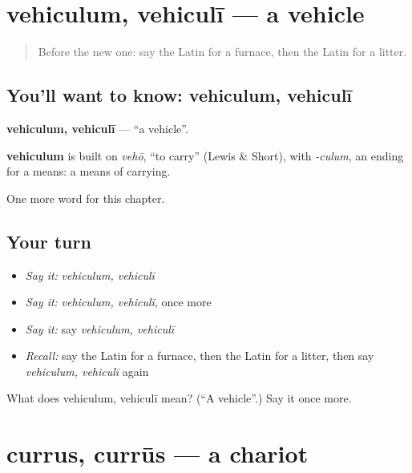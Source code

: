 \section[vehiculum, vehiculī]{vehiculum, vehiculī — a vehicle}

\label{lesson:LA-C217-vehiculum}



\begin{quote}
Before the new one: say the Latin for a furnace, then the Latin for a litter.
\end{quote}

\subsection*{You'll want to know: vehiculum, vehiculī}
\textbf{vehiculum, vehiculī} — \textquotedblleft{}a vehicle\textquotedblright{}.

\begin{cousinweb}
\textbf{vehiculum} is built on \emph{vehō}, \textquotedblleft{}to carry\textquotedblright{} (Lewis \& Short), with \emph{-culum}, an ending for a means: a means of carrying.
\end{cousinweb}

\begin{grammarlens}[title={What you've built}]
One more word for this chapter.
\end{grammarlens}

\subsection*{Your turn}
\begin{itemize}
\raggedright
  \item \emph{Say it:} \emph{vehiculum, vehiculī}
  \item \emph{Say it:} \emph{vehiculum, vehiculī}, once more
  \item \emph{Say it:} say \emph{vehiculum, vehiculī}
  \item \emph{Recall:} say the Latin for a furnace, then the Latin for a litter, then say \emph{vehiculum, vehiculī} again
\end{itemize}

\begin{tcolorbox}[breakable,colback=teal!4,colframe=teal!35!black,title={Before you move on}]
What does vehiculum, vehiculī mean? (\textquotedblleft{}A vehicle\textquotedblright{}.) Say it once more.
\end{tcolorbox}
\section[currus, currūs]{currus, currūs — a chariot}

